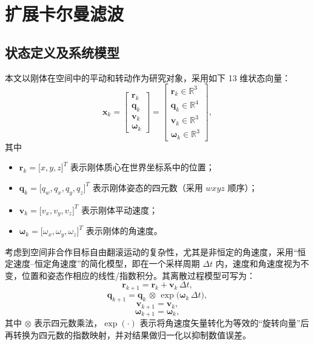 \section{扩展卡尔曼滤波}
\label{sec:ekf_6dof_derivation}

\subsection{状态定义及系统模型}

本文以刚体在空间中的平动和转动作为研究对象，采用如下 13 维状态向量：
\begin{equation}
	\label{eq:xstate}
	\mathbf{x}_k =
	\begin{bmatrix}
		\mathbf{r}_k \\[6pt]
		\mathbf{q}_k \\[6pt]
		\mathbf{v}_k \\[6pt]
		\boldsymbol{\omega}_k
	\end{bmatrix}
	=
	\begin{bmatrix}
		\mathbf{r}_{k} \in \mathbb{R}^3 \\
		\mathbf{q}_{k} \in \mathbb{R}^4 \\
		\mathbf{v}_{k} \in \mathbb{R}^3 \\
		\boldsymbol{\omega}_{k} \in \mathbb{R}^3
	\end{bmatrix},
\end{equation}
其中
\begin{itemize}
	\item \(\mathbf{r}_k = \bigl[x,y,z\bigr]^T\) 表示刚体质心在世界坐标系中的位置；
	\item \(\mathbf{q}_k = \bigl[q_w,q_x,q_y,q_z\bigr]^T\) 表示刚体姿态的四元数（采用 \(wxyz\) 顺序）；
	\item \(\mathbf{v}_k = \bigl[v_x,v_y,v_z\bigr]^T\) 表示刚体平动速度；
	\item \(\boldsymbol{\omega}_k = \bigl[\omega_x,\omega_y,\omega_z\bigr]^T\) 表示刚体的角速度。
\end{itemize}

考虑到空间非合作目标自由翻滚运动的复杂性，尤其是非恒定的角速度，采用“恒定速度–恒定角速度”的简化模型，即在一个采样周期 \(\Delta t\) 内，速度和角速度视为不变，位置和姿态作相应的线性/指数积分。其离散过程模型可写为：
\begin{equation}
	\label{eq:r_update}
	\mathbf{r}_{k+1} = \mathbf{r}_k + \mathbf{v}_k \,\Delta t,
\end{equation}
\begin{equation}
	\label{eq:q_update}
	\mathbf{q}_{k+1} = \mathbf{q}_k \,\otimes\, \exp\bigl(\boldsymbol{\omega}_k\,\Delta t\bigr),
\end{equation}
\begin{equation}
	\label{eq:v_update}
	\mathbf{v}_{k+1} = \mathbf{v}_k,
\end{equation}
\begin{equation}
	\label{eq:omega_update}
	\boldsymbol{\omega}_{k+1} = \boldsymbol{\omega}_k,
\end{equation}
其中 \(\otimes\) 表示四元数乘法，\(\exp(\cdot)\) 表示将角速度矢量转化为等效的“旋转向量”后再转换为四元数的指数映射，并对结果做归一化以抑制数值误差。

